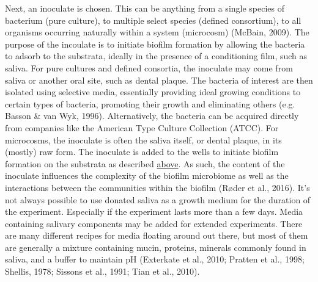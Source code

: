 \documentclass[
  letterpaper,
]{book}
\begin{document}
Next, an inoculate is chosen. This can be anything from a single species
of bacterium (pure culture), to multiple select species (defined
consortium), to all organisms occurring naturally within a system
(microcosm) (McBain, 2009). The purpose of the incoulate is to initiate
biofilm formation by allowing the bacteria to adsorb to the substrata,
ideally in the presence of a conditioning film, such as saliva. For pure
cultures and defined consortia, the inoculate may come from saliva or
another oral site, such as dental plaque. The bacteria of interest are
then isolated using selective media, essentially providing ideal growing
conditions to certain types of bacteria, promoting their growth and
eliminating others (e.g. Basson \& van Wyk, 1996). Alternatively, the
bacteria can be acquired directly from companies like the American Type
Culture Collection (ATCC). For microcosms, the inoculate is often the
saliva itself, or dental plaque, in its (mostly) raw form. The inoculate
is added to the wells to initiate biofilm formation on the substrata as
described \protect\hyperlink{dental-plaque}{above}. As such, the content
of the inoculate influences the complexity of the biofilm microbiome as
well as the interactions between the communities within the biofilm
(Røder et al., 2016). It's not always possible to use donated saliva as
a growth medium for the duration of the experiment. Especially if the
experiment lasts more than a few days. Media containing salivary
components may be added for extended experiments. There are many
different recipes for media floating around out there, but most of them
are generally a mixture containing mucin, proteins, minerals commonly
found in saliva, and a buffer to maintain pH (Exterkate et al., 2010;
Pratten et al., 1998; Shellis, 1978; Sissons et al., 1991; Tian et al.,
2010).
\end{document}
